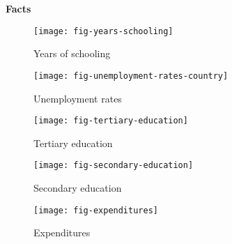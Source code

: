 \begin{frame}\begin{center}
		\LARGE\textbf{Facts}
\end{center}\end{frame}
\begin{frame}
	\begin{figure}[htp]\centering
		\caption{Years of schooling}\scalebox{0.35}
		{\texttt{[image: fig-years-schooling]}}
	\end{figure}
\end{frame}
\begin{frame}
	\begin{figure}[htp]\centering
		\caption{Unemployment rates}\scalebox{0.35}
		{\texttt{[image: fig-unemployment-rates-country]}}
	\end{figure}
\end{frame}
\begin{frame}
	\begin{figure}[htp]\centering
		\caption{Tertiary education}\scalebox{0.35}
		{\texttt{[image: fig-tertiary-education]}}
	\end{figure}
\end{frame}
\begin{frame}
	\begin{figure}[htp]\centering
		\caption{Secondary education}\scalebox{0.35}
		{\texttt{[image: fig-secondary-education]}}
	\end{figure}
\end{frame}
\begin{frame}
	\begin{figure}[htp]\centering
		\caption{Expenditures}\scalebox{0.35}
		{\texttt{[image: fig-expenditures]}}
	\end{figure}
\end{frame}
